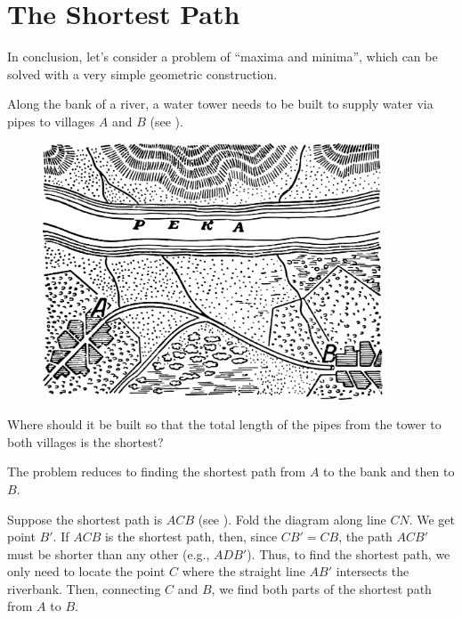 
\section{The Shortest Path}
\label{sec-12.16}

In conclusion, let’s consider a problem of ``maxima and minima'', which can be solved with a very simple geometric construction.


\ques Along the bank of a river, a water tower needs to be built to supply water via pipes to villages $A$ and $B$ (see ).


\begin{figure}[h!]
\centering
\includegraphics[width=0.9\textwidth]{figures/ch-12/fig-191.pdf}
\end{figure}


Where should it be built so that the total length of the pipes from the tower to both villages is the shortest?

\ans The problem reduces to finding the shortest path from $A$ to the bank and then to $B$.

Suppose the shortest path is $ACB$ (see ). Fold the diagram along line $CN$. We get point $B'$. If $ACB$ is the shortest path, then, since $CB' = CB$, the path $ACB'$ must be shorter than any other (e.g., $ADB'$). Thus, to find the shortest path, we only need to locate the point $C$ where the straight line $AB'$ intersects the riverbank. Then, connecting $C$ and $B$, we find both parts of the shortest path from $A$ to $B$.

